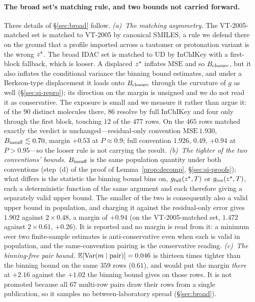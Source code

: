 \paragraph{The broad set's matching rule, and two bounds not carried forward.} Three details of
\S\ref{sec:broad} follow. \emph{(a)~The matching asymmetry.} The VT-2005-matched set is
matched to VT-2005 by canonical SMILES, a rule we defend there on the ground that a profile imported
across a tautomer or protonation variant is the wrong $z^\star$. The broad IDAC set is matched to UD
by InChIKey with a first-block fallback, which is looser. A displaced $z^\star$ inflates
$\mathrm{MSE}$ and so $B_{\mathrm{closure}}$, but it also inflates the conditional variance the binning bound
estimates, and under a Berkson-type displacement it loads onto $B_{\mathrm{closure}}$ through the curvature of $g$
as well (\S\ref{sec:si-repro}); its direction on the margin is unsigned and we do not read it as
conservative. The exposure is
small and we measure it rather than argue it: of the $90$ distinct molecules there, $86$ resolve by
full InChIKey and four only through the first block, touching $12$ of the $477$ rows. On the $465$
rows matched exactly the verdict is unchanged---residual-only convention $\mathrm{MSE}\ 1.930$,
$B_{\mathrm{insuff}}\lesssim0.70$, margin $+0.53$ at $P\approx0.9$; full convention $1.926$, $0.49$, $+0.94$ at
$P>0.95$---so the looser rule is not carrying the result.
\emph{(b)~The tighter of the two conventions' bounds.} $B_{\mathrm{insuff}}$ is the same population quantity
under both conventions (step~(d) of the proof of Lemma~\ref{prop:decomp},
\S\ref{sec:si-proofs}); what differs is the statistic the binning bound bins on,
$g_{\text{full}}(z^\star,T)$ or $g_{\text{res}}(z^\star,T)$, each a deterministic function of the same
argument and each therefore giving a separately valid upper bound. The smaller of the two is
consequently also a valid upper bound in population, and charging it against the residual-only error gives
$1.902$ against $2\times0.48$, a margin of $+0.94$ (on the VT-2005-matched set, $1.472$ against $2\times0.61$,
$+0.26$). It is reported and no margin is read from it: a minimum over two finite-sample estimates is
anti-conservative even when each is valid in population, and the same-convention pairing is the
conservative reading. \emph{(c)~The binning-free pair bound.} $\mathbb{E}[\mathrm{Var}(m\mid\text{pair})]=0.046$ is
thirteen times tighter than the binning bound on the same $359$ rows ($0.61$), and would put the
margin \emph{there} at $+2.16$ against the $+1.02$ the binning bound gives on those rows. It is not
promoted because all $67$ multi-row pairs draw their rows from a single publication, so it samples no
between-laboratory spread (\S\ref{sec:broad}).

